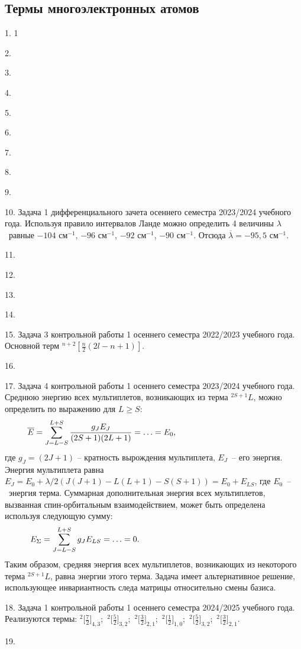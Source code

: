 \subsection{Термы многоэлектронных атомов}
1. 1 \par
2. \par
3. \par
4. \par
5. \par
6. \par
7. \par
8. \par
9. \par
10. Задача 1 дифференциального зачета осеннего семестра 2023/2024 учебного года. Используя правило интервалов Ланде можно определить 4 величины $\lambda$~равные $-104$ см$^{-1}$, $-96$ см$^{-1}$, $-92$ см$^{-1}$, $-90$ см$^{-1}$. Отсюда $\overline \lambda = -95,5$ см$^{-1}$.\par
11. \par
12. \par
13. \par
14. \par
15. Задача 3 контрольной работы 1 осеннего семестра 2022/2023 учебного года. Основной терм $^{n+2 }\left[\frac n2 (2l-n+1)\right]$.\par
16. \par
17. Задача 4 контрольной работы 1 осеннего семестра 2023/2024 учебного года. Среднюю энергию всех мультиплетов, возникающих из терма $^{2S+1}L$, можно определить по выражению для $L\geq S$:
\begin{equation*}
\begin{aligned}
&\overline E=\sum_{J=L-S}^{L+S} \dfrac{g_JE_J}{(2S+1)(2L+1)} = \ldots = E_0,\hspace{41mm}
\end{aligned}
\end{equation*}
где $g_J=(2J+1)$ – кратность вырождения мультиплета, $E_J$~– его энергия. Энергия мультиплета равна $E_J=E_0+\lambda/2 ( J(J+1)-L(L+1)-S(S+1) )=E_0+E_{LS}$, где $E_0$~–~энергия терма. Суммарная дополнительная энергия всех мультиплетов, вызванная спин-орбитальным взаимодействием, может быть определена используя следующую сумму:
\begin{equation*}
\begin{aligned}
&E_{\Sigma}=\sum_{J=L-S}^{L+S} g_JE_{LS} = \ldots = 0.\hspace{55mm}
\end{aligned}
\end{equation*}
Таким образом, средняя энергия всех мультиплетов, возникающих из некоторого терма $^{2S+1}L$, равна энергии этого терма. Задача имеет альтернативное решение, использующее инвариантность следа матрицы относительно смены базиса.
\par
18. Задача 1 контрольной работы 1 осеннего семестра 2024/2025 учебного года. Реализуются термы: ${^2}\Big[ \frac{7}{2}\Big]_{4,3}$;\, ${^2}\Big[ \frac{5}{2}\Big]_{3,2}$;\, ${^2}\Big[ \frac{3}{2}\Big]_{2,1}$;\, ${^2}\Big[ \frac12\Big]_{1,0}$;\, ${^2}\Big[ \frac{5}{2}\Big]_{3,2}$;\, ${^2}\Big[ \frac{3}{2}\Big]_{2,1}.$\par
19. \par
\newpage

